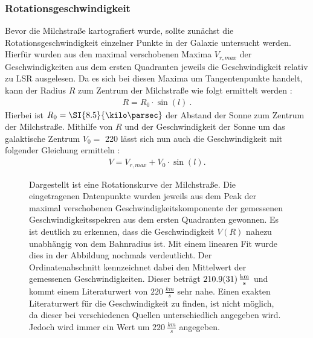 \subsubsection{Rotationsgeschwindigkeit}
Bevor die Milchstraße kartografiert wurde, sollte zunächst die Rotationsgeschwindigkeit einzelner Punkte in der Galaxie untersucht werden. Hierfür wurden aus den maximal verschobenen Maxima $V_{r,max}$ der Geschwindigkeiten aus dem ersten Quadranten jeweils die Geschwindigkeit relativ zu LSR ausgelesen. Da es sich bei diesen Maxima um Tangentenpunkte handelt, kann der Radius $R$ zum Zentrum der Milchstraße wie folgt ermittelt werden \cite{H1}:
\begin{align}
    R = R_0 \cdot \sin(l) \ .
    \label{eq:TangenteR}
\end{align}
Hierbei ist $R_0 = \SI{8.5}{\kilo \parsec}$ der Abstand der Sonne zum Zentrum der Milchstraße. Mithilfe von $R$ und der Geschwindigkeit der Sonne um das galaktische Zentrum $V_0 = $ \SI{220}{} lässt sich nun auch die Geschwindigkeit mit folgender Gleichung ermitteln \cite{H1}:
\begin{align}
    V = V_{r,max} + V_0 \cdot \sin(l) .
    \label{eq:V(R)}
\end{align}

\begin{figure}[H]
    \centering
    \resizebox{0.8\textwidth}{!}{}
    \caption[Rotationskurve der Milchstraße]{Dargestellt ist eine Rotationskurve der Milchstraße. Die eingetragenen Datenpunkte wurden jeweils aus dem Peak der maximal verschobenen Geschwindigkeitskomponente der gemessenen Geschwindigkeitsspekren aus dem ersten Quadranten gewonnen. Es ist deutlich zu erkennen, dass die Geschwindigkeit $V(R)$ nahezu unabhängig von dem Bahnradius ist. Mit einem linearen Fit wurde dies in der Abbildung nochmals verdeutlicht. Der Ordinatenabschnitt kennzeichnet dabei den Mittelwert der gemessenen Geschwindigkeiten. Dieser beträgt $\SI{210.9 \pm 3.1}{\frac{km}{s}}$ und kommt einem Literaturwert von $\SI{220}{\frac{km}{s}}$ \cite{LSR} sehr nahe. Einen exakten Literaturwert für die Geschwindigkeit zu finden, ist nicht möglich, da dieser bei verschiedenen Quellen unterschiedlich angegeben wird. Jedoch wird immer ein Wert um $\SI{220}{\frac{km}{s}}$ angegeben.}
    \label{fig:VvonR}
\end{figure}

